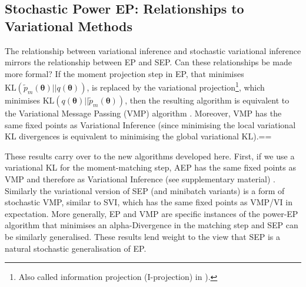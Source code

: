 \subsection{Stochastic Power EP: Relationships to Variational Methods}
%
The relationship between variational inference and stochastic variational inference \cite{hoffman:svi} mirrors the relationship between EP and SEP. Can these relationships be made more formal? If the moment projection step in EP, that minimises $\mathrm{KL}(\tilde{p}_m(\bm{\theta}) ||q(\bm{\theta}))$, is replaced by the variational projection\footnote{Also called information projection (I-projection) in \cite{amari:ig}).}, which minimises $\mathrm{KL}(q(\bm{\theta})||\tilde{p}_m(\bm{\theta}) )$,  then the resulting algorithm is equivalent to the Variational Message Passing (VMP) algorithm \cite{minka:divergence}. Moreover, VMP has the same fixed points as Variational Inference \cite{winn:vmp} (since minimising the local variational KL divergences is equivalent to minimising the global variational KL).==

These results carry over to the new algorithms developed here. First, if we use a variational KL for the moment-matching step, AEP has the same fixed points as VMP and therefore as Variational Inference (see supplementary material) . Similarly the variational version of SEP (and minibatch variants) is a form of stochastic VMP, similar to SVI, which has the same fixed points as VMP/VI in expectation. More generally, EP and VMP are specific instances of the power-EP algorithm that minimises an alpha-Divergence in the matching step and SEP can be similarly generalised. These results lend weight to the view that SEP is a natural stochastic generalisation of EP.



